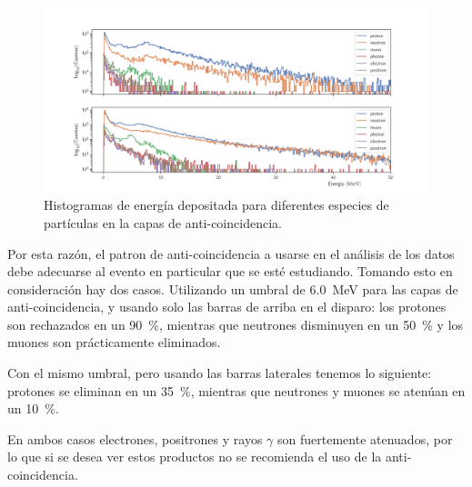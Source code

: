 \begin{figure}
        \centering
        \includegraphics[width=\textwidth]{anti-pattern.pdf}
        \caption{Histogramas de energía depositada para diferentes especies de partículas en la capas de anti-coincidencia.}
        \label{fig:anti-patterns}
\end{figure}

Por esta razón, el patron de anti-coincidencia a usarse en el análisis de los datos debe adecuarse al evento en particular que se esté estudiando. Tomando esto en consideración hay dos casos. Utilizando un umbral de \SI{6.0}{\mega\electronvolt} para las capas de anti-coincidencia, y usando solo las barras de arriba en el disparo: los protones son rechazados en un \SI{90}{\percent}, mientras que neutrones disminuyen en un \SI{50}{\percent} y los muones son prácticamente eliminados.

Con el mismo umbral, pero usando las barras laterales tenemos lo siguiente: protones se eliminan en un \SI{35}{\percent}, mientras que neutrones y muones se atenúan en un \SI{10}{\percent}.

En ambos casos electrones, positrones y rayos $\gamma$ son fuertemente atenuados, por lo que si se desea ver estos productos no se recomienda el uso de la anti-coincidencia.
